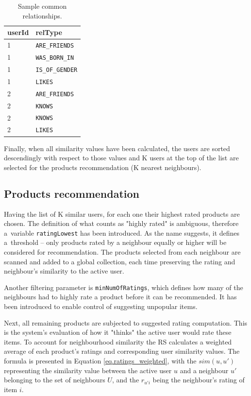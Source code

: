 \documentclass[12pt]{report}
\begin{document}
\begin{table}[!h]
\centering
\caption{Sample common relationships.}
\label{table.sample_rels}
\vspace{3mm}
\begin{tabular}{ll}
\hline
userId         & relType \vspace{2mm} \\ \hline
1       & \texttt{ARE\_FRIENDS}                  \\ 
1       & \texttt{WAS\_BORN\_IN}              \\
1       & \texttt{IS\_OF\_GENDER}       \\
1       & \texttt{LIKES}      \\
2       & \texttt{ARE\_FRIENDS}          \\
2       & \texttt{KNOWS}       \\
2       & \texttt{KNOWS}            \\
2       & \texttt{LIKES}              \vspace{2mm} \\ \hline
\end{tabular}
\end{table}

Finally, when all similarity values have been calculated, the users are sorted descendingly with respect to those values and K users at the top of the list are selected for the products recommendation (K nearest neighbours).

\subsection{Products recommendation}

Having the list of K similar users, for each one their highest rated products are chosen. The definition of what counts as "highly rated" is ambiguous, therefore a~variable \texttt{ratingLowest} has been introduced. As the name suggests, it defines a~threshold -- only products rated by a neighbour equally or higher will be considered for recommendation. The products selected from each neighbour are scanned and added to a global collection, each time preserving the rating and neighbour's similarity to the active user.

Another filtering parameter is \texttt{minNumOfRatings}, which defines how many of the neighbours had to highly rate a product before it can be recommended. It has been introduced to enable control of suggesting unpopular items. 

Next, all remaining products are subjected to suggested rating computation. This is the system's evaluation of how it "thinks" the active user would rate these items. To account for neighbourhood similarity the RS calculates a weighted average of each product's ratings and corresponding user similarity values. The formula is presented in Equation \ref{eq.ratings_weighted}, with the $sim(u,u')$ representing the similarity value between the active user $u$ and a neighbour $u'$ belonging to the set of neighbours $U$, and the $r_{u'i}$ being the neighbour's rating of item $i$.
\end{document}
